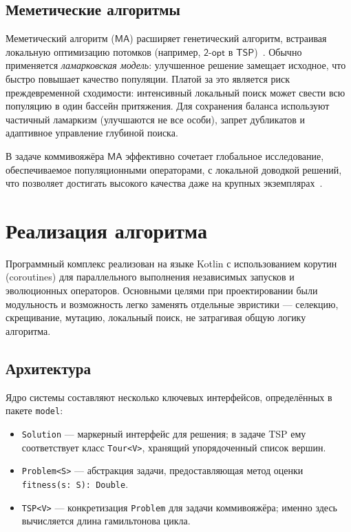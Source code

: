 \documentclass[a4paper,12pt]{article}
\begin{document}
\subsection{Меметические алгоритмы}

Меметический алгоритм ($\mathsf{MA}$) расширяет генетический алгоритм,
встраивая локальную оптимизацию потомков (например, $\mathsf{2\mbox{-}opt}$
в $\mathsf{TSP}$)~\cite{gendreau2010handbook}. Обычно применяется
\textit{ламарковская модель}: улучшенное решение замещает исходное, что
быстро повышает качество популяции. Платой за это является риск
преждевременной сходимости: интенсивный локальный поиск может свести всю
популяцию в один бассейн притяжения. Для сохранения баланса используют
частичный ламаркизм (улучшаются не все особи), запрет дубликатов и
адаптивное управление глубиной поиска.

В задаче коммивояжёра $\mathsf{MA}$ эффективно сочетает глобальное
исследование, обеспечиваемое популяционными операторами, с локальной
доводкой решений, что позволяет достигать высокого качества даже на
крупных экземплярах~\cite{gendreau2010handbook}.

\section{Реализация алгоритма}

Программный комплекс реализован на языке Kotlin с использованием корутин (coroutines) для параллельного выполнения независимых запусков и эволюционных операторов. Основными целями при проектировании были модульность и возможность легко заменять отдельные эвристики — селекцию, скрещивание, мутацию, локальный поиск, не затрагивая общую логику алгоритма.

\subsection{Архитектура}

Ядро системы составляют несколько ключевых интерфейсов, определённых в пакете \texttt{model}:

\begin{itemize}
\item \texttt{Solution} — маркерный интерфейс для решения; в задаче TSP ему соответствует класс \texttt{Tour<V>}, хранящий упорядоченный список вершин.
\item \texttt{Problem<S>} — абстракция задачи, предоставляющая метод оценки \texttt{fitness(s: S): Double}.
\item \texttt{TSP<V>} — конкретизация \texttt{Problem} для задачи коммивояжёра; именно здесь вычисляется длина гамильтонова цикла.
\end{itemize}
\end{document}

